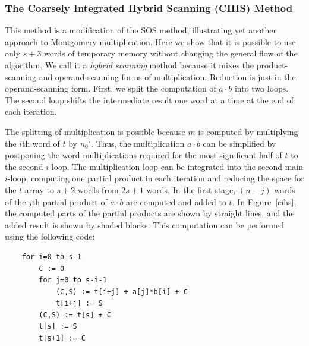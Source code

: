 \documentclass[twocolumn]{svjour3}          %
\begin{document}
\subsubsection{The Coarsely Integrated Hybrid Scanning (CIHS) Method}
\label{sect-cihs}

This method is a modification of the SOS method, illustrating yet
another approach to Montgomery multiplication.  Here we show that it
is possible to use only $s+3$ words of temporary memory without
changing the general flow of the algorithm.  We call it a \textit{hybrid
  scanning} method because it mixes the product-scanning and
operand-scanning forms of multiplication.  Reduction is just in the
operand-scanning form.  First, we split the computation of $a \cdot
b$ into two loops.  The second loop shifts the intermediate result one
word at a time at the end of each iteration.

The splitting of multiplication is possible because $m$ is computed by
multiplying the $i$th word of $t$ by $n_0'$.  Thus, the multiplication
$a\cdot b$ can be simplified by postponing the word multiplications
required for the most significant half of $t$ to the second $i$-loop.
The multiplication loop can be integrated into the second main
$i$-loop, computing one partial product in each iteration and reducing
the space for the $t$ array to $s+2$ words from $2s+1$ words.  In the
first stage, $(n-j)$ words of the $j$th partial product of $a\cdot b$
are computed and added to $t$. In Figure~\ref{cihs}, the
computed parts of the partial products are shown by straight lines,
and the added result is shown by shaded blocks. This computation can
be performed using the following code:
%
\begin{verbatim}
    for i=0 to s-1
        C := 0
        for j=0 to s-i-1
            (C,S) := t[i+j] + a[j]*b[i] + C
            t[i+j] := S
        (C,S) := t[s] + C
        t[s] := S
        t[s+1] := C
\end{verbatim}
\end{document}
